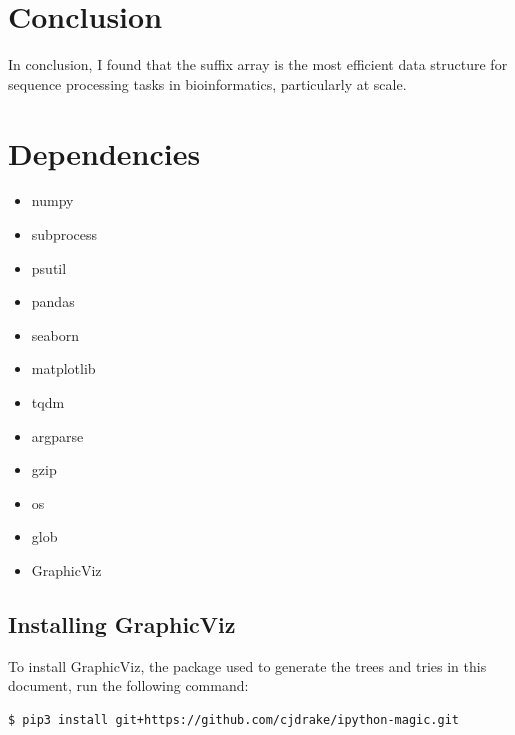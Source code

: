 \documentclass[11pt, letterpaper]{article}
\begin{document}
\subsection{}

\subsection{}

\subsection{}

\subsection{}

\section{Conclusion}
In conclusion, I found that the suffix array is the most efficient data structure for sequence processing tasks in bioinformatics, 
particularly at scale.

\section{Dependencies}
\begin{itemize}
  \item numpy
  \item subprocess
  \item psutil
  \item pandas
  \item seaborn
  \item matplotlib
  \item tqdm
  \item argparse
  \item gzip
  \item os 
  \item glob
  \item GraphicViz
\end{itemize}

\subsection{Installing GraphicViz}
To install GraphicViz, the package used to generate the trees and tries in this document, run the following command:
\begin{verbatim}
$ pip3 install git+https://github.com/cjdrake/ipython-magic.git
\end{verbatim}
\end{document}
